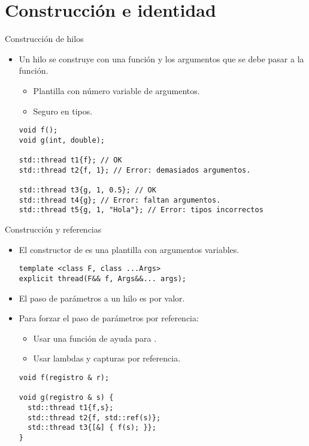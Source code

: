 \section{Construcción e identidad}

\begin{frame}[t,fragile]{Construcción de hilos}
\begin{itemize}
  \item Un hilo se construye con una función y los argumentos que se debe pasar a la función.
    \begin{itemize}
      \item Plantilla con número variable de argumentos.
      \item Seguro en tipos.
    \end{itemize}
\begin{lstlisting}
void f();
void g(int, double);

std::thread t1{f}; // OK
std::thread t2{f, 1}; // Error: demasiados argumentos.

std::thread t3{g, 1, 0.5}; // OK
std::thread t4{g}; // Error: faltan argumentos.
std::thread t5{g, 1, "Hola"}; // Error: tipos incorrectos
\end{lstlisting}
\end{itemize}
\end{frame}

\begin{frame}[t,fragile]{Construcción y referencias}
\begin{itemize}
  \item El constructor de  es una plantilla con argumentos variables.
\begin{lstlisting}
template <class F, class ...Args> 
explicit thread(F&& f, Args&&... args);
\end{lstlisting}
  \item El paso de parámetros a un hilo es por valor.
  \item Para forzar el paso de parámetros por referencia:
    \begin{itemize}
      \item Usar una función de ayuda para .
      \item Usar lambdas y capturas por referencia.
    \end{itemize}
\begin{lstlisting}
void f(registro & r);

void g(registro & s) {
  std::thread t1{f,s};
  std::thread t2{f, std::ref(s)};
  std::thread t3{[&] { f(s); }};
}
\end{lstlisting}
\end{itemize}
\end{frame}

